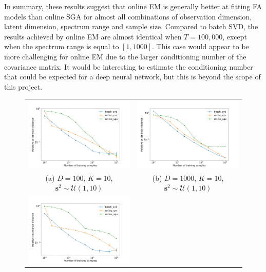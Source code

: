 \documentclass[msc,deptreport.inf]{infthesis} %
\newcommand{\matr}[1]{\mathbf{#1}}
\begin{document}
In summary, these results suggest that online EM is generally better at fitting FA models than online SGA for almost all combinations of observation dimension, latent dimension, spectrum range and sample size. Compared to batch SVD, the results achieved by online EM are almost identical when $T=100,000$, except when the spectrum range is equal to $[1, 1000]$. This case would appear to be more challenging for online EM due to the larger conditioning number of the covariance matrix. It would be interesting to estimate the conditioning number that could be expected for a deep neural network, but this is beyond the scope of this project.  
\begin{figure}[!htbp] 
	\begin{tabular}{cc}
		 \includegraphics[width=70mm]{plots/online_fa_covar_distance__observation_dim=100__latent_dim=10__spectrum_min=1__spectrum_max=10.png}
		 & \includegraphics[width=70mm]{plots/online_fa_covar_distance__observation_dim=1000__latent_dim=10__spectrum_min=1__spectrum_max=10.png} \\
		 (a) $D=100$, $K=10$, $\matr{s}^2 \sim \mathcal{U}(1, 10)$ 
		 & (b) $D=1000$, $K=10$, $\matr{s}^2 \sim \mathcal{U}(1, 10)$\\[6pt]
		 \includegraphics[width=70mm]{plots/online_fa_covar_distance__observation_dim=100__latent_dim=10__spectrum_min=1__spectrum_max=100.png}

\end{tabular}
\end{figure}
\end{document}
